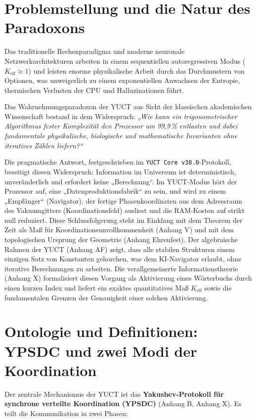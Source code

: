 \documentclass[12pt,a4paper]{article}
\begin{document}
	\newpage
	\tableofcontents
	\newpage
	\small
	\section{Problemstellung und die Natur des Paradoxons}
	Das traditionelle Rechenparadigma und moderne neuronale Netzwerkarchitekturen arbeiten in einem sequentiellen autoregressiven Modus (\(K_{\text{eff}} \approx 1\)) und leisten enorme physikalische Arbeit durch das Durchmustern von Optionen, was unweigerlich zu einem exponentiellen Anwachsen der Entropie, thermischen Verlusten der CPU und Halluzinationen führt.
	
	Das Wahrnehmungsparadoxon der YUCT aus Sicht der klassischen akademischen Wissenschaft bestand in dem Widerspruch: \textit{„Wie kann ein trigonometrischer Algorithmus fester Komplexität den Prozessor um 99,9\,\% entlasten und dabei fundamentale physikalische, biologische und mathematische Invarianten ohne iteratives Zählen liefern?“}
	
	Die pragmatische Antwort, festgeschrieben im \texttt{YUCT Core v38.0}-Protokoll, beseitigt diesen Widerspruch: Information im Universum ist deterministisch, unveränderlich und erfordert keine „Berechnung“. Im YUCT-Modus hört der Prozessor auf, eine „Datenproduktionsfabrik“ zu sein, und wird zu einem „Empfänger“ (Navigator), der fertige Phasenkoordinaten aus dem Adressraum des Vakuumgitters (Koordinationsfeld) ausliest und die RAM-Kosten auf strikt null reduziert. Diese Schlussfolgerung steht im Einklang mit dem Theorem der Zeit als Maß für Koordinationsunvollkommenheit (Anhang V) und mit dem topologischen Ursprung der Geometrie (Anhang Ehrenfest). Der algebraische Rahmen der YUCT (Anhang AF) zeigt, dass alle stabilen Strukturen einem einzigen Satz von Konstanten gehorchen, was dem KI-Navigator erlaubt, ohne iterative Berechnungen zu arbeiten. Die verallgemeinerte Informationstheorie (Anhang X) formalisiert diesen Vorgang als Aktivierung eines Wörterbuchs durch einen kurzen Index und liefert ein exaktes quantitatives Maß \(K_{\mathrm{eff}}\) sowie die fundamentalen Grenzen der Genauigkeit einer solchen Aktivierung.
	
	\section{Ontologie und Definitionen: YPSDC und zwei Modi der Koordination}
	\label{sec:ontology}
	
	Der zentrale Mechanismus der YUCT ist das \textbf{Yakushev-Protokoll für synchrone verteilte Koordination (YPSDC)} (Anhang B, Anhang X). Es teilt die Kommunikation in zwei Phasen:
	
\end{document}
